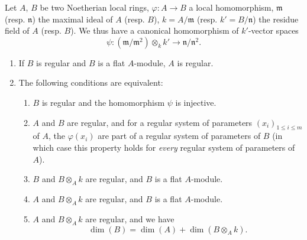 \begin{proposition}[17.3.3]
\label{0.17.3.3}
Let $A$, $B$ be two Noetherian local rings, $\varphi:A\to B$ a local homomorphism, $\mathfrak{m}$ \textup{(resp. $\mathfrak{n}$)} the maximal ideal of $A$ \textup{(resp. $B$)}, $k=A/\mathfrak{m}$ \textup{(resp. $k'=B/\mathfrak{n}$)} the residue field of $A$ \textup{(resp. $B$)}.
We thus have a canonical homomorphism of $k'$-vector spaces
\[
\label{0.17.3.3.1}
  \psi:(\mathfrak{m}/\mathfrak{m}^2)\otimes_k k'\to\mathfrak{n}/\mathfrak{n}^2.
  \tag{17.3.3.1}
\]
\begin{enumerate}
  \item[{\rm(i)}] If $B$ is regular and $B$ is a flat $A$-module, $A$ is regular.
  \item[{\rm(ii)}] The following conditions are equivalent:
  \begin{enumerate}
    \item[{\textit{a)}}] $B$ is regular and the homomorphism $\psi$  is injective.
    \item[{\textit{b)}}] $A$ and $B$ are regular, and for a regular system of parameters $(x_i)_{1\leq i\leq m}$ of $A$, the $\varphi(x_i)$ are part of a regular system of parameters of $B$ \textup{(in which case this property holds for \emph{every} regular system of parameters of $A$)}.
    \item[{\textit{c)}}] $B$ and $B\otimes_A k$ are regular, and $B$ is a flat $A$-module.
    \item[{\textit{d)}}] $A$ and $B\otimes_A k$ are regular, and $B$ is a flat $A$-module.
    \item[{\textit{e)}}] $A$ and $B\otimes_A k$ are regular, and we have
    \[
    \label{0.17.3.3.2}
      \dim(B)=\dim(A)+\dim(B\otimes_A k).
      \tag{17.3.3.2}
    \]
  \end{enumerate}
\end{enumerate}
\end{proposition}

